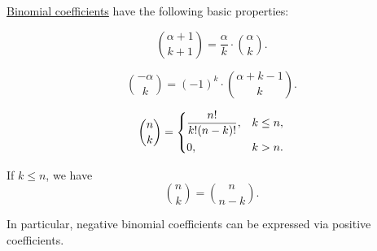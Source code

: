 \begin{proposition}\label{thm:def:binomial_coefficient}
  \hyperref[def:binomial_coefficient]{Binomial coefficients} have the following basic properties:
  \begin{thmenum}
    \begin{equation}\label{eq:thm:def:binomial_coefficient/plus_one}
      \binom {\alpha + 1} {k + 1} = \frac \alpha k \cdot \binom \alpha k.
    \end{equation}

    \begin{equation}\label{eq:thm:def:binomial_coefficient/negative}
      \binom {-\alpha} k = (-1)^k \cdot \binom {\alpha + k - 1} k.
    \end{equation}

    \begin{equation}\label{eq:thm:def:binomial_coefficient/factorials}
      \binom n k = \begin{dcases}
        \frac {n!} {k!(n-k)!}, &k \leq n, \\
        0,                     &k > n.
      \end{dcases}
    \end{equation}

     If \( k \leq n \), we have
    \begin{equation}\label{eq:thm:def:binomial_coefficient/symmetry}
      \binom n k = \binom n {n - k}.
    \end{equation}
  \end{thmenum}
\end{proposition}
\begin{comments}
  \item In particular, negative binomial coefficients can be expressed via positive coefficients.
\end{comments}
